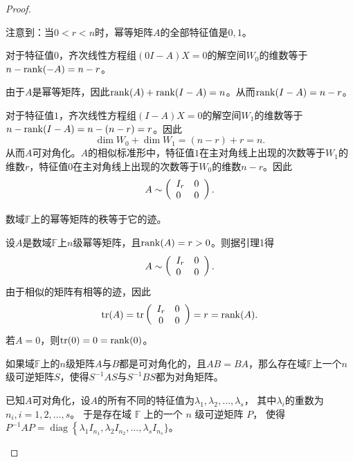\begin{enumerate}[1~]
\begin{proof}
\begin{subproof}
注意到：当$0<r<n$时，幂等矩阵$A$的全部特征值是$0, 1$。

对于特征值$0$，齐次线性方程组$(0I-A)X=0$的解空间$W_0$的维数等于$n-{\rm rank}(-A)=n-r$。

由于$A$是幂等矩阵，因此${\rm rank}(A)+{\rm rank}(I-A)=n$。从而${\rm rank}(I-A)=n-r$。

对于特征值$1$，齐次线性方程组$(I-A)X=0$的解空间$W_1$的维数等于$n-{\rm rank}(I-A)=n-(n-r)=r$。因此\[
\operatorname { dim } W _ { 0 } + \operatorname { dim } W _ { 1 } = ( n - r ) + r = n.
\]
从而$A$可对角化。$A$的相似标准形中，特征值$1$在主对角线上出现的次数等于$W_1$的维数$r$，特征值$0$在主对角线上出现的次数等于$W_0$的维数$n-r$。因此\[
A \sim \left( \begin{array} { l l } { I _ { r } } & { 0 } \\ { 0 } & { 0 } \end{array} \right).
\]
\end{subproof}

\begin{lemma}
数域$\mathbb{F}$上的幂等矩阵的秩等于它的迹。
\end{lemma}
\begin{subproof}
设$A$是数域$\mathbb{F}$上$n$级幂等矩阵，且${\rm rank}(A)=r>0$。则据引理1得\[
A \sim \left( \begin{array} { l l } { I _ { r } } & { 0 } \\ { 0 } & { 0 } \end{array} \right).
\]
由于相似的矩阵有相等的迹，因此\[
\operatorname { tr } ( A ) = \operatorname { tr } \left( \begin{array} { c c } { I _ { r } } & { 0 } \\ { 0 } & { 0 } \end{array} \right) = r = \operatorname { rank } ( A ).
\]
若$A=0$，则${\rm tr}(0)=0={\rm rank}(0)$。
\end{subproof}

\begin{lemma}
 如果域$\mathbb{F}$上的$n$级矩阵$A$与$B$都是可对角化的，且$AB=BA$，那么存在域$\mathbb{F}$上一个$n$级可逆矩阵$S$，使得$S^{-1}AS$与$S^{-1}BS$都为对角矩阵。
\end{lemma}
\begin{subproof}
已知$A$可对角化，设$A$的所有不同的特征值为$\lambda _ { 1 } , \lambda _ { 2 } , \dotsc , \lambda _ { s }$，
其中$\lambda_i$的重数为$n_i, i=1, 2, \dotsc, s$。
于是存在域 $\mathbb{F}$ 上的一个 $n$ 级可逆矩阵 $P$，
使得 $P ^ { - 1 } A P = \operatorname { diag } \left\{ \lambda _ { 1 } I _ { n _ { 1 }} , \lambda _ { 2 } I _ { n _ { 2 } } , \dotsc , \lambda _ { s } I _ { n _ { s } } \} \right.$。


\end{subproof}
\end{proof}
\end{enumerate}
